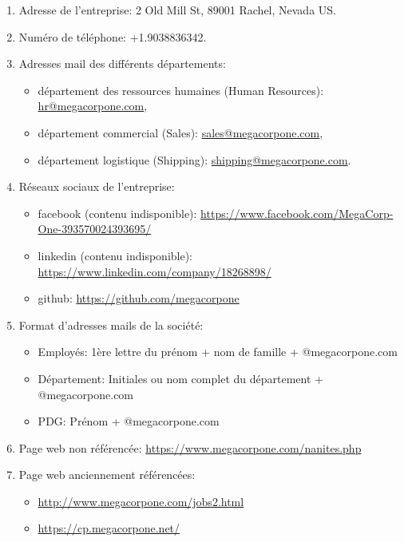 \documentclass[french,oneside]{article}
\begin{document}
\begin{enumerate}
    \item Adresse de l'entreprise: 2 Old Mill St, 89001 Rachel, Nevada US.
    \item Numéro de téléphone: +1.9038836342.
    \item Adresses mail des différents départements:
    \begin{itemize}
        \item département des ressources humaines (Human Resources): \url{hr@megacorpone.com},
        \item département commercial (Sales): \url{sales@megacorpone.com},
        \item département logistique (Shipping): \url{shipping@megacorpone.com}.
    \end{itemize}
    \item Réseaux sociaux de l'entreprise:
    \begin{itemize}
        \item facebook (contenu indisponible): \url{https://www.facebook.com/MegaCorp-One-393570024393695/}
        \item linkedin (contenu indisponible): \url{https://www.linkedin.com/company/18268898/}
        \item github: \url{https://github.com/megacorpone}
    \end{itemize}
    \item Format d'adresses mails de la société:
    \begin{itemize}
        \item Employés: 1ère lettre du prénom + nom de famille + @megacorpone.com
        \item Département: Initiales ou nom complet du département + @megacorpone.com
        \item PDG: Prénom + @megacorpone.com
    \end{itemize}
    \item Page web non référencée: \url{https://www.megacorpone.com/nanites.php}
    \item Page web anciennement référencées:
    \begin{itemize}
        \item \url{http://www.megacorpone.com/jobs2.html}
        \item \url{https://cp.megacorpone.net/}
    \end{itemize}
\end{enumerate}
\end{document}
